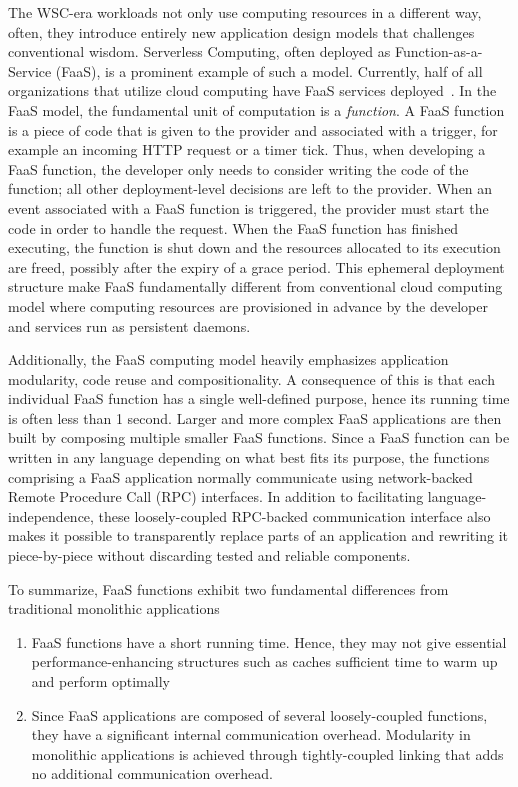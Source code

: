 \documentclass[../main.tex]{subfiles}
\begin{document}
\begin{refsection}
The WSC-era workloads not only use computing resources in a different way, often, they introduce entirely new application design models that  challenges conventional wisdom. Serverless Computing, often deployed as Function-as-a-Service (FaaS), is a prominent example of such a model. Currently, half of all organizations that utilize cloud computing have FaaS services deployed~\cite{serverless_state}. In the FaaS model, the fundamental unit of computation is a \emph{function}. A FaaS function is a piece of code that is given to the provider and associated with a trigger, for example an incoming HTTP request or a timer tick. Thus, when developing a FaaS function, the developer only needs to consider writing the code of the function; all other deployment-level decisions are left to the provider. When an event associated with a FaaS function is triggered, the provider must start the code in order to handle the request. When the FaaS function has finished executing, the function is shut down and the resources allocated to its execution are freed, possibly after the expiry of a grace period. This ephemeral deployment structure make FaaS fundamentally different from conventional cloud computing model where computing resources are provisioned in advance by the developer and services run as persistent daemons.

Additionally, the FaaS computing model heavily emphasizes application modularity, code reuse and compositionality. A consequence of this is that each individual FaaS function has a single well-defined purpose, hence its running time is often less than 1 second. Larger and more complex FaaS applications are then built by composing multiple smaller FaaS functions. Since a FaaS function can be written in any language depending on what best fits its purpose, the functions comprising a FaaS application normally communicate using network-backed Remote Procedure Call (RPC) interfaces. In addition to facilitating language-independence, these loosely-coupled RPC-backed communication interface also makes it possible to transparently replace parts of an application and rewriting it piece-by-piece without discarding tested and reliable components.

To summarize, FaaS functions exhibit two fundamental differences from traditional monolithic applications

\begin{enumerate}
\item FaaS functions have a short running time. Hence, they may not give essential performance-enhancing structures such as caches sufficient time to warm up and perform optimally
\item Since FaaS applications are composed of several loosely-coupled functions, they have a significant internal communication overhead. Modularity in monolithic applications is achieved through tightly-coupled linking that adds no additional communication overhead.
\end{enumerate}


\end{refsection}
\end{document}

